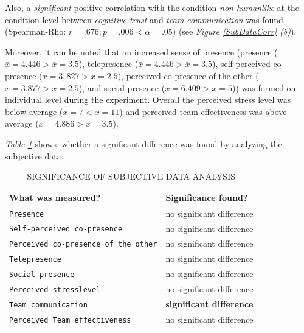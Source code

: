\documentclass[sigchi]{acmart}
\begin{document}
Also, a \textit{significant} positive correlation with the condition \textit{non-humanlike} at the condition level between \textit{cognitive trust} and \textit{team communication} was found (Spearman-Rho: $r =.676; p =.006 < \alpha = .05$) (see \textit{Figure \ref{SubDataCorr} (b)}).

Moreover, it can be noted that an increased sense of presence (presence ($\bar{x} = 4.446 > \bar{x} = 3.5$), telepresence ($\bar{x} = 4.446 > \bar{x} = 3.5$), self-perceived co-presence ($\bar{x} = 3, 827 > \bar{x} = 2.5$), perceived co-presence of the other ($\bar{x} = 3.877 > \bar{x} = 2.5$), and social presence ($\bar{x} = 6.409 > \bar{x} = 5$)) was formed on individual level during the experiment. Overall the perceived stress level was below average ($\bar{x} = 7 < \bar{x} = 11$) and perceived team effectiveness was above average ($\bar{x} = 4.886 > \bar{x} = 3.5$).

\textit{Table \ref{SubDataSigs}} shows, whether a significant difference was found by analyzing the subjective data.

\begin{table}
	\caption{SIGNIFICANCE OF SUBJECTIVE DATA ANALYSIS}
  \label{SubDataSigs}
  \begin{tabular}{ll}
    \toprule
    What was measured? & Significance found? \\
    \midrule
     \texttt{Presence} & no significant difference \\
   	 \texttt{Self-perceived co-presence} & no significant difference \\
     \texttt{Perceived co-presence of the other} & no significant difference  \\
     \texttt{Telepresence} & no significant difference \\
     \texttt{Social presence} & no significant difference \\
     \texttt{Perceived stresslevel} & no significant difference \\
     \texttt{Team communication} & \textbf{significant difference} \\
     \texttt{Perceived Team effectiveness} & no significant difference  \\
    \bottomrule
  \end{tabular}
\end{table}
\end{document}
